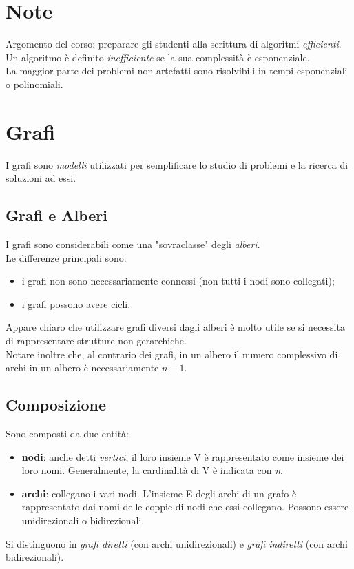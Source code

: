 \section{Note}
Argomento del corso: preparare gli studenti alla scrittura di algoritmi \textit{efficienti}.
Un algoritmo è definito \textit{inefficiente} se la sua complessità è esponenziale.\\
La maggior parte dei problemi non artefatti sono risolvibili in tempi esponenziali o polinomiali.

\section{Grafi}
I grafi sono \textit{modelli} utilizzati per semplificare lo studio di problemi e la ricerca di soluzioni ad essi.
\subsection{Grafi e Alberi}
I grafi sono considerabili come una "sovraclasse" degli \textit{alberi}. \\
Le differenze principali sono:
\begin{itemize}
	\item i grafi non sono necessariamente connessi (non tutti i nodi sono collegati);
	\item i grafi possono avere cicli.
	
\end{itemize}
Appare chiaro che utilizzare grafi diversi dagli alberi è molto utile se si necessita di rappresentare strutture non gerarchiche. \\
Notare inoltre che, al contrario dei grafi, in un albero il numero complessivo di archi in un albero è necessariamente $ n-1 $.


\subsection{Composizione}
Sono composti da due entità:
\begin{itemize}
	\item \textbf{nodi}: anche detti \textit{vertici}; il loro insieme V è rappresentato come insieme dei loro nomi. Generalmente, la cardinalità di V è indicata con \textit{n}.
	\item \textbf{archi}: collegano i vari nodi. L'insieme E degli archi di un grafo è rappresentato dai nomi delle coppie di nodi che essi collegano. Possono essere unidirezionali o bidirezionali.
\end{itemize}
Si distinguono in \textit{grafi diretti} (con archi unidirezionali) e \textit{grafi indiretti} (con archi bidirezionali).
